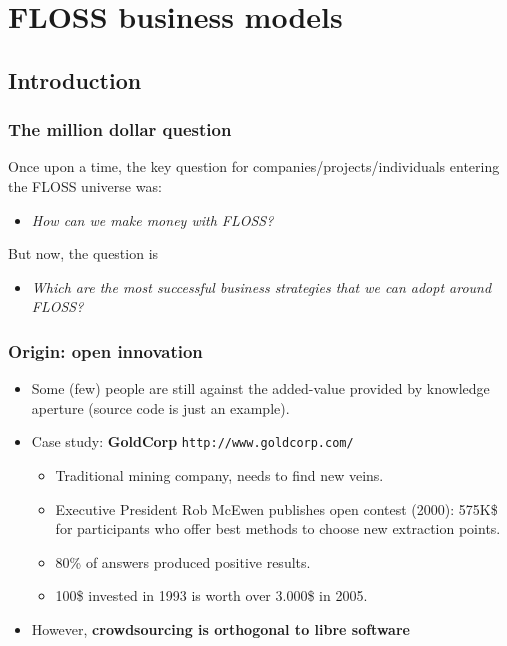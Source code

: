 
\section{FLOSS business models}

\subsection{Introduction}

\begin{frame}
\frametitle{The million dollar question}

Once upon a time, the key question for companies/projects/individuals entering the
FLOSS universe was:

\begin{itemize}
 \item \textit{How can we make money with FLOSS?}
\end{itemize}

\pause
But now, the question is

\begin{itemize}
\item \textit{Which are the most successful business strategies that we can adopt around FLOSS?}
\end{itemize}
\end{frame}

\begin{frame}
 \frametitle{Origin: open innovation}
 \begin{itemize}
  \item Some (few) people are still against the added-value provided by knowledge aperture (source
code is just an example).
  \item Case study: \textbf{GoldCorp} \texttt{http://www.goldcorp.com/}
    \begin{itemize}
    \item Traditional mining company, needs to find new veins.
    \item Executive President Rob McEwen publishes open contest (2000): 575K\$ for participants
    who offer best methods to choose new extraction points.
    \item 80\% of answers produced positive results.
    \item 100\$ invested in 1993 is worth over 3.000\$ in 2005.
    \end{itemize}
  \item However, \textbf{crowdsourcing is orthogonal to libre software}
 \end{itemize}
\end{frame}

